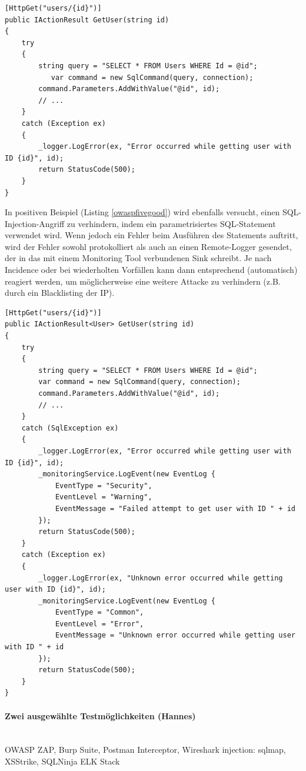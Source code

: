 \documentclass[notitlepage, hidelinks]{article}
\begin{document}
\begin{lstlisting}[language={[Sharp]C},frame=single,caption=Negativbeispiel Improper Assets Management,label=owaspfivebad]
[HttpGet("users/{id}")]
public IActionResult GetUser(string id)
{
    try
    {
        string query = "SELECT * FROM Users WHERE Id = @id";
    	   var command = new SqlCommand(query, connection);
        command.Parameters.AddWithValue("@id", id);
        // ...
    }
    catch (Exception ex)
    {
        _logger.LogError(ex, "Error occurred while getting user with ID {id}", id);
        return StatusCode(500);
    }
}
\end{lstlisting}

In positiven Beispiel (Listing \ref{owaspfivegood}) wird ebenfalls versucht, einen SQL-Injection-Angriff zu verhindern, indem ein parametrisiertes SQL-Statement verwendet wird. Wenn jedoch ein Fehler beim Ausführen des Statements auftritt, wird der Fehler sowohl protokolliert als auch an einen Remote-Logger gesendet, der in das mit einem Monitoring Tool verbundenen Sink schreibt. Je nach Incidence oder bei wiederholten Vorfällen kann dann entsprechend (automatisch) reagiert werden, um möglicherweise eine weitere Attacke zu verhindern (z.B. durch ein Blacklisting der IP).

\begin{lstlisting}[language={[Sharp]C},frame=single,caption=Positivbeispiel Improper Assets Management,label=owaspfivegood]
[HttpGet("users/{id}")]
public IActionResult<User> GetUser(string id)
{
    try
    {
        string query = "SELECT * FROM Users WHERE Id = @id";
        var command = new SqlCommand(query, connection);
        command.Parameters.AddWithValue("@id", id);
        // ...
    }
    catch (SqlException ex)
    {
        _logger.LogError(ex, "Error occurred while getting user with ID {id}", id);
        _monitoringService.LogEvent(new EventLog { 
            EventType = "Security",
            EventLevel = "Warning",
            EventMessage = "Failed attempt to get user with ID " + id
        });
        return StatusCode(500);
    }
    catch (Exception ex)
    {
        _logger.LogError(ex, "Unknown error occurred while getting user with ID {id}", id);
        _monitoringService.LogEvent(new EventLog { 
            EventType = "Common",
            EventLevel = "Error",
            EventMessage = "Unknown error occurred while getting user with ID " + id
        });
        return StatusCode(500);
    }
}
\end{lstlisting}

\paragraph{Zwei ausgewählte Testmöglichkeiten (Hannes)} \mbox{} \\
 OWASP ZAP, Burp Suite, Postman Interceptor, Wireshark
 injection: sqlmap, XSStrike, SQLNinja
 ELK Stack
 
\end{document}
